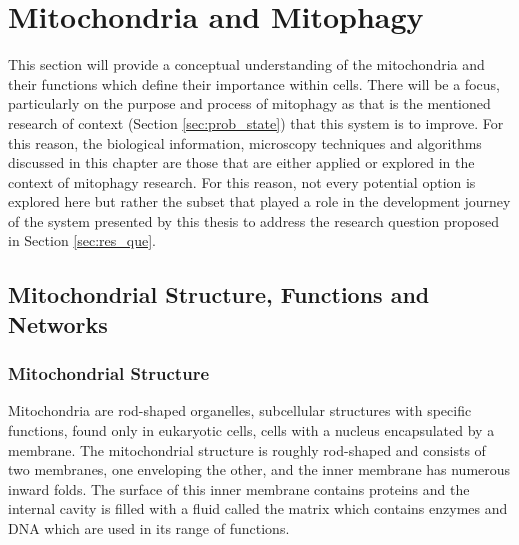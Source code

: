 
\section{Mitochondria and Mitophagy}\label{sec:mito_detail}
This section will provide a conceptual understanding of the mitochondria and their functions which define their importance within cells. There will be a focus, particularly on the purpose and process of mitophagy as that is the mentioned research of context (Section \ref{sec:prob_state}) that this system is to improve. For this reason, the biological information, microscopy techniques and algorithms discussed in this chapter are those that are either applied or explored in the context of mitophagy research. For this reason, not every potential option is explored here but rather the subset that played a role in the development journey of the system presented by this thesis to address the research question proposed in Section \ref{sec:res_que}.
\subsection{Mitochondrial Structure, Functions and Networks}
\subsubsection{Mitochondrial Structure}
Mitochondria are rod-shaped organelles, subcellular structures with specific functions, found only in eukaryotic cells, cells with a nucleus encapsulated by a membrane. The mitochondrial structure is roughly rod-shaped and consists of two membranes, one enveloping the other, and the inner membrane has numerous inward folds. The surface of this inner membrane contains proteins and the internal cavity is filled with a fluid called the matrix which contains enzymes and DNA which are used in its range of functions.\cite{introPhys-2013}
